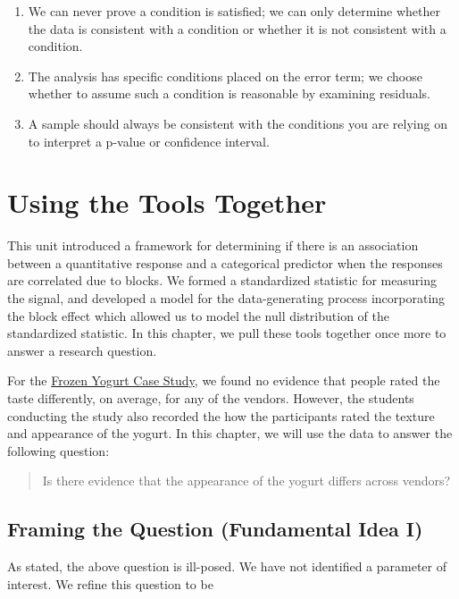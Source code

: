 \documentclass[
]{book}
\providecommand{\tightlist}{%
  \setlength{\itemsep}{0pt}\setlength{\parskip}{0pt}}
\theoremstyle{plain}
\theoremstyle{mydefn}
\theoremstyle{myexmpl}
\theoremstyle{remark}
\begin{document}
\begin{enumerate}
\def\labelenumi{\arabic{enumi}.}
\tightlist
\item
  We can never prove a condition is satisfied; we can only determine whether the data is consistent with a condition or whether it is not consistent with a condition.
\item
  The analysis has specific conditions placed on the error term; we choose whether to assume such a condition is reasonable by examining residuals.
\item
  A sample should always be consistent with the conditions you are relying on to interpret a p-value or confidence interval.
\end{enumerate}

\hypertarget{Blockrecap}{%
\chapter{Using the Tools Together}\label{Blockrecap}}

This unit introduced a framework for determining if there is an association between a quantitative response and a categorical predictor when the responses are correlated due to blocks. We formed a standardized statistic for measuring the signal, and developed a model for the data-generating process incorporating the block effect which allowed us to model the null distribution of the standardized statistic. In this chapter, we pull these tools together once more to answer a research question.

For the \protect\hyperlink{CaseYogurt}{Frozen Yogurt Case Study}, we found no evidence that people rated the taste differently, on average, for any of the vendors. However, the students conducting the study also recorded the how the participants rated the texture and appearance of the yogurt. In this chapter, we will use the data to answer the following question:

\begin{quote}
Is there evidence that the appearance of the yogurt differs across vendors?
\end{quote}

\hypertarget{framing-the-question-fundamental-idea-i-2}{%
\section{Framing the Question (Fundamental Idea I)}\label{framing-the-question-fundamental-idea-i-2}}

As stated, the above question is ill-posed. We have not identified a parameter of interest. We refine this question to be
\end{document}
